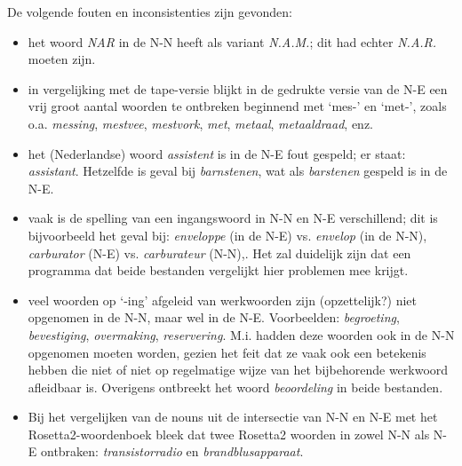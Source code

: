 De volgende fouten en inconsistenties zijn gevonden:
\begin{itemize}
   \item het woord {\em NAR} in de N-N heeft als variant {\em N.A.M.}; dit
         had echter {\em N.A.R.} moeten zijn.
   \item in vergelijking met de tape-versie blijkt in de gedrukte versie van 
         de N-E een vrij groot aantal woorden te ontbreken
         beginnend met `mes-' en `met-', zoals o.a. {\em messing}, 
         {\em mestvee}, {\em mestvork}, {\em met}, {\em metaal}, 
         {\em metaaldraad}, enz. 
   \item het (Nederlandse) woord {\em assistent} is in de N-E fout 
         gespeld; er staat: {\em assistant}.
         Hetzelfde is geval bij {\em barnstenen}, wat als {\em barstenen}
         gespeld is in de N-E.
   \item vaak is de spelling van een ingangswoord in N-N en N-E verschillend;
         dit is bijvoorbeeld het geval bij: {\em enveloppe} (in de N-E) vs.
         {\em envelop} (in de N-N), {\em carburator} (N-E) vs. {\em carburateur}
         (N-N),. Het zal duidelijk zijn dat een programma dat beide bestanden 
         vergelijkt hier problemen mee krijgt.
   \item veel woorden op `-ing' afgeleid van werkwoorden zijn (opzettelijk?) 
         niet opgenomen in de N-N, maar wel in de N-E. Voorbeelden: 
         {\em begroeting}, {\em bevestiging}, {\em overmaking},
         {\em reservering}. M.i.  
         hadden deze woorden ook in de N-N opgenomen moeten worden, gezien
         het feit dat ze vaak ook een betekenis hebben die niet of niet op
         regelmatige wijze van het bijbehorende werkwoord afleidbaar is.
         Overigens ontbreekt het woord {\em beoordeling} in beide bestanden.
   \item Bij het vergelijken
         van de nouns uit de intersectie van N-N en N-E met het 
         Rosetta2-woordenboek bleek dat twee Rosetta2 woorden in zowel N-N als
         N-E ontbraken: {\em transistorradio} en {\em brandblusapparaat}.

\end{itemize}



